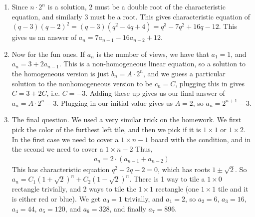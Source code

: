 \documentclass[12pt]{article}
\theoremstyle{definitionstyle}
\begin{document}
\begin{enumerate}[leftmargin=\labelsep]
		\item Since $n \cdot 2^n$ is a solution, $2$ must be a double root of the characteristic equation, and similarly $3$ must be a root. This gives characteristic equation of $(q-3)(q-2)^2 = (q-3)(q^2-4q+4) = q^3 - 7q^2 + 16q - 12$. This gives us an answer of $a_n = 7a_{n-1} - 16a_{n-2} + 12$.
		
		\item Now for the fun ones. If $a_n$ is the number of views, we have that $a_1 = 1$, and $a_n = 3 + 2a_{n-1}$. This is a non-homogeneous linear equation, so a solution to the homogeneous version is just $b_n = A \cdot 2^n$, and we guess a particular solution to the nonhomogeneous version to be $c_n = C$, plugging this in gives $C = 3 + 2C$, i.e. $C = -3$. Adding these up gives us our final answer of $a_n = A \cdot 2^n - 3$. Plugging in our initial value gives us $A = 2$, so $a_n = 2^{n+1} - 3$.
		
		\item The final question. We used a very similar trick on the homework. We first pick the color of the furthest left tile, and then we pick if it is $1 \times 1$ or $1 \times 2$. In the first case we need to cover a $1 \times {n-1}$ board with the condition, and in the second we need to cover a $1 \times {n-2}$ Thus,
		\begin{align*}
			a_n = 2 \cdot (a_{n-1} + a_{n-2})
		\end{align*}
		This has characteristic equation $q^2 - 2q - 2 = 0$, which has roots $1 \pm \sqrt{2}$. So $a_n = C_1(1+\sqrt{2})^n + C_2(1-\sqrt{2})^n$. There is 1 way to tile a $1 \times 0$ rectangle trivially, and 2 ways to tile the $1 \times 1$ rectangle (one $1 \times 1$ tile and it is either red or blue). We get $a_0 = 1$ trivially, and $a_1 = 2$, so $a_2 = 6$, $a_3 = 16$, $a_4 = 44$, $a_5 = 120$, and $a_6 = 328$, and finally $a_7 = 896$.
	\end{enumerate}
\end{document}
